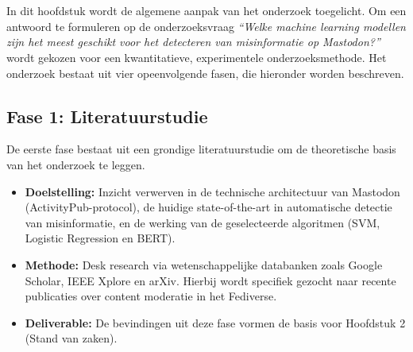 \documentclass[a4paper,11pt]{report}
\begin{document}

\chapter{}%
\label{ch:methodologie}

In dit hoofdstuk wordt de algemene aanpak van het onderzoek toegelicht. Om een antwoord te formuleren op de onderzoeksvraag \textit{``Welke machine learning modellen zijn het meest geschikt voor het detecteren van misinformatie op Mastodon?''} wordt gekozen voor een kwantitatieve, experimentele onderzoeksmethode. Het onderzoek bestaat uit vier opeenvolgende fasen, die hieronder worden beschreven.

\section{Fase 1: Literatuurstudie}
De eerste fase bestaat uit een grondige literatuurstudie om de theoretische basis van het onderzoek te leggen.
\begin{itemize}
    \item \textbf{Doelstelling:} Inzicht verwerven in de technische architectuur van Mastodon (ActivityPub-protocol), de huidige state-of-the-art in automatische detectie van misinformatie, en de werking van de geselecteerde algoritmen (SVM, Logistic Regression en BERT).
    \item \textbf{Methode:} Desk research via wetenschappelijke databanken zoals Google Scholar, IEEE Xplore en arXiv. Hierbij wordt specifiek gezocht naar recente publicaties over content moderatie in het Fediverse.
    \item \textbf{Deliverable:} De bevindingen uit deze fase vormen de basis voor Hoofdstuk 2 (Stand van zaken).
\end{itemize}
\end{document}
